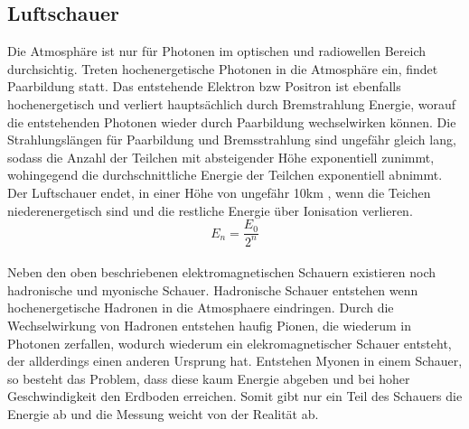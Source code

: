 \subsection{Luftschauer}
Die Atmosphäre ist nur für Photonen im optischen und radiowellen Bereich durchsichtig. Treten hochenergetische Photonen in die Atmosphäre ein, findet Paarbildung statt. Das entstehende Elektron bzw Positron ist ebenfalls hochenergetisch und verliert hauptsächlich durch Bremstrahlung Energie, worauf die entstehenden Photonen wieder durch Paarbildung wechselwirken können. Die Strahlungslängen für Paarbildung und Bremsstrahlung sind ungefähr gleich lang, sodass die Anzahl der Teilchen mit absteigender Höhe exponentiell zunimmt, wohingegend die durchschnittliche Energie der Teilchen exponentiell abnimmt. Der Luftschauer endet, in einer Höhe von ungefähr 10km 
\cite{iwas}, wenn die Teichen niederenergetisch sind und die restliche Energie über Ionisation verlieren.
\begin{equation}
E_n=\frac{E_0}{2^n}
\end{equation}\\
Neben den oben beschriebenen elektromagnetischen Schauern existieren noch hadronische und myonische Schauer. Hadronische Schauer entstehen wenn hochenergetische Hadronen in die Atmosphaere eindringen. Durch die Wechselwirkung von Hadronen entstehen haufig Pionen, die wiederum in Photonen zerfallen, wodurch wiederum ein elekromagnetischer Schauer entsteht, der allderdings einen anderen Ursprung hat. Entstehen Myonen in einem Schauer, so besteht das Problem, dass diese kaum Energie abgeben und bei hoher Geschwindigkeit den Erdboden erreichen. Somit gibt nur ein Teil des Schauers die Energie ab und die Messung weicht von der Realität ab.

